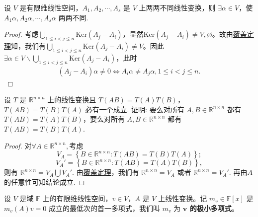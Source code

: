 \documentclass[../../main.tex]{subfiles}%
\begin{document}
\begin{example}
设 \( V \) 是有限维线性空间，\( A_1, A_2, \cdots, A_s \) 是 \( V \) 上两两不同线性变换，则 \( \exists \alpha \in V \)，使 \( A_1\alpha, A_2\alpha, \cdots, A_s\alpha \) 两两不同.
\end{example}
\begin{proof}

考虑$\bigcup_{1\leqslant i<j\leqslant n}{\mathrm{Ker}\left( A_j-A_i \right)}$，显然$\mathrm{Ker}\left( A_j-A_i \right) \ne V,\varnothing$。故由\hyperref[theorem:覆盖定理]{覆盖定理}知，我们有$\bigcup_{1\leqslant i<j\leqslant n}{\mathrm{Ker}\left( A_j-A_i \right)}\ne V$。因此$\exists \alpha \in V\backslash \bigcup_{1\leqslant i<j\leqslant n}{\mathrm{Ker}\left( A_j-A_i \right)}$，此时
\begin{align*}
\left( A_j-A_i \right) \alpha \ne 0\Longleftrightarrow A_i\alpha \ne A_j\alpha ,1\leqslant i<j\leqslant n.
\end{align*}

\end{proof}

\begin{example}
设 \( T \) 是 \( \mathbb{R}^{n \times n} \) 上的线性变换且 \( T(AB) = T(A)T(B) \)，\( T(AB) = T(B)T(A) \) 必有一个成立. 证明: 要么对所有 \( A, B \in \mathbb{R}^{n \times n} \) 都有 \( T(AB) = T(A)T(B) \)，要么对所有 \( A, B \in \mathbb{R}^{n \times n} \) 都有 \( T(AB) = T(B)T(A) \).  
\end{example}
\begin{proof}

对$\forall A\in \mathbb{R}^{n\times n},$考虑  
\[
V_A = \left\{ B \in \mathbb{R}^{n \times n} : T(AB) = T(B)T(A) \right\};
\]  
\[
V_A' = \left\{ B \in \mathbb{R}^{n \times n} : T(AB) = T(A)T(B) \right\},
\]  
则有 \( \mathbb{R}^{n \times n} = V_A \bigcup V_A' \). 由\hyperref[theorem:覆盖定理]{覆盖定理}，我们有 \( \mathbb{R}^{n \times n} = V_A \) 或者 \( \mathbb{R}^{n \times n} = V_A' \).  
再由$A$的任意性可知结论成立.

\end{proof}

\begin{definition}
设 \( V \) 是域 \( \mathbb{F} \) 上的有限维线性空间，\( v \in V \)，\( A \) 是 \( V \) 上线性变换。记 \( m_v \in \mathbb{F}[x] \) 是 \( m_v(A)v = 0 \) 成立的最低次的首一多项式，我们叫 \( m_v \) 为\textbf{ \( \boldsymbol{v} \) 的极小多项式}。
\end{definition}
\end{document}
